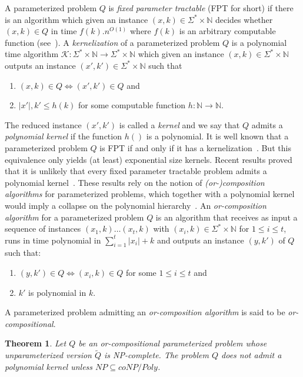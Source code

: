 \documentclass[11pt]{article}
\newtheorem{theorem}[lemma]{Theorem}
\begin{document}
A parameterized problem $Q$  is \emph{fixed parameter tractable} (FPT for short) if there is an algorithm which given an instance $(x,k)\in \Sigma^*\times \mathbb{N}$ decides whether $(x,k)\in Q$
in time $f(k).n^{O(1)}$ where $f(k)$ is an arbitrary computable function (see~\cite{DF99,FG06,Nie06}). 
A \emph{kernelization} of a parameterized problem $Q$ is a polynomial time algorithm $\mathcal{K}:
\Sigma^*\times \mathbb{N}\rightarrow \Sigma^*\times \mathbb{N}$ which given an instance $(x,k)\in \Sigma^*\times \mathbb{N}$ outputs an instance $(x',k')\in \Sigma^*\times \mathbb{N}$ such that 
\begin{enumerate}
\item $(x,k)\in Q \Leftrightarrow (x',k')\in Q$ and

\item $|x'|,k'\leqslant h(k)$ for some computable function $h: \mathbb{N}\rightarrow \mathbb{N}$.
\end{enumerate}

The reduced instance $(x',k')$ is called a \emph{kernel} and we say that $Q$ admits a \emph{polynomial kernel} if the function $h()$ is a polynomial. 
It is well known that a parameterized problem $Q$ is FPT if and only if it has a kernelization~\cite{Nie06}. But this equivalence only yields (at least) exponential size kernels. Recent results proved that it is unlikely that every fixed parameter tractable problem admits a polynomial kernel~\cite{BDFH08}. These results rely on the notion of \emph{(or-)composition algorithms} for parameterized problems, which together with a polynomial kernel would imply a collapse on the polynomial hierarchy~\cite{BDFH08}.
An \emph{or-composition algorithm} for a parameterized problem $Q$ is an algorithm that receives as input a sequence of instances $(x_1,k)\dots (x_t,k)$ with $(x_i,k)\in \Sigma^*\times\mathbb{N}$ for $1\leqslant i\leqslant t$, runs in time polynomial in $\sum_{i=1}^t |x_i|+k$ 
and outputs an instance $(y,k')$ of $Q$ such that:
\begin{enumerate}
\item $(y,k')\in Q \Leftrightarrow (x_i,k)\in Q$ for some $1\leqslant i\leqslant t$ and
\item $k'$ is polynomial in $k$.
\end{enumerate}

A parameterized problem admitting an \emph{or-composition algorithm} is said to be \emph{or-compositional}.

\begin{theorem}\cite{BDFH08,FS08}\label{th:or-comp}
Let $Q$ be an or-compositional parameterized problem whose unparameterized version $\tilde{Q}$ is NP-complete. The problem $Q$ does not admit a polynomial kernel unless $NP\subseteq coNP/Poly$.
\end{theorem}
\end{document}
